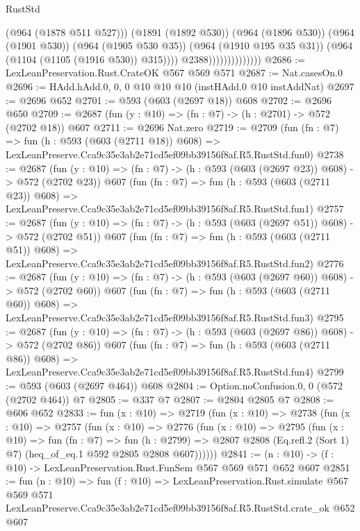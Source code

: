 \begin{lexlean}{RustStd}
\begin{coremodule}
                                      (@964 (@1878 @511 @527)))
                                    (@1891 (@1892 @530))
                                    (@964 (@1896 @530))
                                    (@964 (@1901 @530))
                                    (@964 (@1905 @530 @35))
                                    (@964 (@1910 @195 @35 @31))
                                    (@964 (@1104 (@1105 (@1916 @530)) @315))))
                                @2388))))))))))))))
@2686 := LexLeanPreservation.Rust.CrateOK @567 @569 @571
@2687 := Nat.casesOn.{0}
@2696 := HAdd.hAdd.{0, 0, 0} @10 @10 @10 (instHAdd.{0} @10 instAddNat)
@2697 := @2696 @652
@2701 := @593 (@603 (@2697 @18)) @608
@2702 := @2696 @650
@2709 := @2687 (fun (y : @10) => (fn : @7) -> (h : @2701) -> @572 (@2702 @18)) @607
@2711 := @2696 Nat.zero
@2719 := @2709
    (fun (fn : @7) =>
    fun (h : @593 (@603 (@2711 @18)) @608) =>
    LexLeanPreserve.Cca9c35e3ab2e71cd5ef09bb39156f8af.R5.RustStd.fun0)
@2738 := @2687
    (fun (y : @10) => (fn : @7) -> (h : @593 (@603 (@2697 @23)) @608) -> @572 (@2702 @23))
    @607
    (fun (fn : @7) =>
    fun (h : @593 (@603 (@2711 @23)) @608) =>
    LexLeanPreserve.Cca9c35e3ab2e71cd5ef09bb39156f8af.R5.RustStd.fun1)
@2757 := @2687
    (fun (y : @10) => (fn : @7) -> (h : @593 (@603 (@2697 @51)) @608) -> @572 (@2702 @51))
    @607
    (fun (fn : @7) =>
    fun (h : @593 (@603 (@2711 @51)) @608) =>
    LexLeanPreserve.Cca9c35e3ab2e71cd5ef09bb39156f8af.R5.RustStd.fun2)
@2776 := @2687
    (fun (y : @10) => (fn : @7) -> (h : @593 (@603 (@2697 @60)) @608) -> @572 (@2702 @60))
    @607
    (fun (fn : @7) =>
    fun (h : @593 (@603 (@2711 @60)) @608) =>
    LexLeanPreserve.Cca9c35e3ab2e71cd5ef09bb39156f8af.R5.RustStd.fun3)
@2795 := @2687
    (fun (y : @10) => (fn : @7) -> (h : @593 (@603 (@2697 @86)) @608) -> @572 (@2702 @86))
    @607
    (fun (fn : @7) =>
    fun (h : @593 (@603 (@2711 @86)) @608) =>
    LexLeanPreserve.Cca9c35e3ab2e71cd5ef09bb39156f8af.R5.RustStd.fun4)
@2799 := @593 (@603 (@2697 @464)) @608
@2804 := Option.noConfusion.{0, 0} (@572 (@2702 @464)) @7
@2805 := @337 @7
@2807 := @2804 @2805 @7
@2808 := @606 @652
@2833 := fun (x : @10) =>
  @2719
    (fun (x : @10) =>
    @2738
      (fun (x : @10) =>
      @2757
        (fun (x : @10) =>
        @2776
          (fun (x : @10) =>
          @2795
            (fun (x : @10) =>
            fun (fn : @7) =>
            fun (h : @2799) =>
            @2807 @2808 (Eq.refl.{2} (Sort 1) @7) (heq_of_eq.{1} @592 @2805 @2808 @607))))))
@2841 := (n : @10) -> (f : @10) -> LexLeanPreservation.Rust.FunSem @567 @569 @571 @652 @607
@2851 := fun (n : @10) =>
  fun (f : @10) =>
  LexLeanPreservation.Rust.simulate
    @567
    @569
    @571
    LexLeanPreserve.Cca9c35e3ab2e71cd5ef09bb39156f8af.R5.RustStd.crate_ok
    @652
    @607
\end{coremodule}
\end{lexlean}

